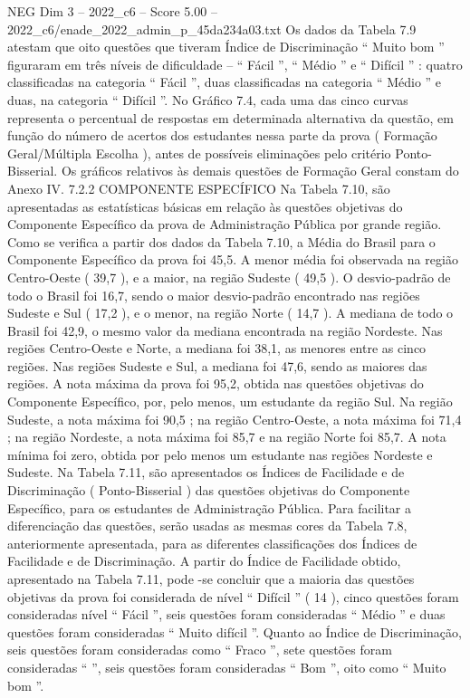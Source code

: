 \begin{textsample}{NEG Dim 3 – 2022\_c6 – Score 5.00 – 2022\_c6/enade\_2022\_admin\_p\_45da234a03.txt}
Os dados da Tabela 7.9 atestam que oito questões que tiveram Índice de Discriminação “ Muito bom ” figuraram em três níveis de dificuldade – “ Fácil ”, “ Médio ” e “ Difícil ” : quatro classificadas na categoria “ Fácil ”, duas classificadas na categoria “ Médio ” e duas, na categoria “ Difícil ”.
No Gráfico 7.4, cada uma das cinco curvas representa o percentual de respostas em determinada alternativa da questão, em função do número de acertos dos estudantes nessa parte da prova ( Formação Geral/Múltipla Escolha ), antes de possíveis eliminações pelo critério Ponto-Bisserial.
Os gráficos relativos às demais questões de Formação Geral constam do Anexo IV. 7.2.2 COMPONENTE ESPECÍFICO Na Tabela 7.10, são apresentadas as estatísticas básicas em relação às questões objetivas do Componente Específico da prova de Administração Pública por grande região.
Como se verifica a partir dos dados da Tabela 7.10, a Média do Brasil para o Componente Específico da prova foi 45,5.
A menor média foi observada na região Centro-Oeste ( 39,7 ), e a maior, na região Sudeste ( 49,5 ).
O desvio-padrão de todo o Brasil foi 16,7, sendo o maior desvio-padrão encontrado nas regiões Sudeste e Sul ( 17,2 ), e o menor, na região Norte ( 14,7 ).
A mediana de todo o Brasil foi 42,9, o mesmo valor da mediana encontrada na região Nordeste.
Nas regiões Centro-Oeste e Norte, a mediana foi 38,1, as menores entre as cinco regiões.
Nas regiões Sudeste e Sul, a mediana foi 47,6, sendo as maiores das regiões.
A nota máxima da prova foi 95,2, obtida nas questões objetivas do Componente Específico, por, pelo menos, um estudante da região Sul.
Na região Sudeste, a nota máxima foi 90,5 ; na região Centro-Oeste, a nota máxima foi 71,4 ; na região Nordeste, a nota máxima foi 85,7 e na região Norte foi 85,7.
A nota mínima foi zero, obtida por pelo menos um estudante nas regiões Nordeste e Sudeste.
Na Tabela 7.11, são apresentados os Índices de Facilidade e de Discriminação ( Ponto-Bisserial ) das questões objetivas do Componente Específico, para os estudantes de Administração Pública.
Para facilitar a diferenciação das questões, serão usadas as mesmas cores da Tabela 7.8, anteriormente apresentada, para as diferentes classificações dos Índices de Facilidade e de Discriminação.
A partir do Índice de Facilidade obtido, apresentado na Tabela 7.11, pode -se concluir que a maioria das questões objetivas da prova foi considerada de nível “ Difícil ” ( 14 ), cinco questões foram consideradas nível “ Fácil ”, seis questões foram consideradas “ Médio ” e duas questões foram consideradas “ Muito difícil ”.
Quanto ao Índice de Discriminação, seis questões foram consideradas como “ Fraco ”, sete questões foram consideradas “ ”, seis questões foram consideradas “ Bom ”, oito como “ Muito bom ”.

\end{textsample}
